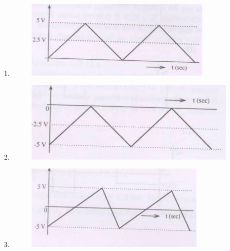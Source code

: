 \documentclass[journal,12pt,onecolumn]{IEEEtran}
\theoremstyle{remark}
\begin{document}
\begin{enumerate}[start=1, label=Q.\arabic*]
\begin{enumerate}
    \item 
    \begin{figure}[H]
        \includegraphics[width=\columnwidth]{Fig/q46-A.png}
        \caption{}
    \end{figure}


    \item 
    \begin{figure}[H]
        \includegraphics[width=\columnwidth]{Fig/q46-B.png}
        \caption{}
    \end{figure}

    
    \item 
    \begin{figure}[H]
        \includegraphics[width=\columnwidth]{Fig/q46-C.png}
        \caption{}
    \end{figure}



\end{enumerate}
\end{enumerate}
\end{document}

